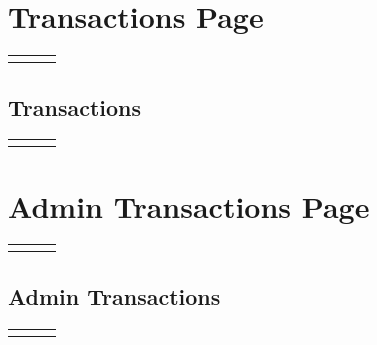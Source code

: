 \documentclass[12pt, letterpaper]{article}
\newcommand{\IPO}[3]{
  \begin{center}
    \begin{tabularx}{\linewidth}{XXX}
      \toprule
      \thead{Input} & \thead{Process} & \thead{Output} \\
      \midrule
      \RaggedRight{#1} & \RaggedRight{#2} & \RaggedRight{#3} \\
      \bottomrule
    \end{tabularx}
  \end{center}
}
\newcommand{\n}{\newline}
\begin{document}
\section{Transactions Page}

\IPO{``Transactions'' button}{Render navigation bar (\ref{navbar})\n Render transactions}{Transactions page}

\subsection{Transactions}

\IPO{\begin{itemize}\item User ID (\texttt{int})\item Filter by (\texttt{enum})\end{itemize}}{Query database for transactions linked to specified user ID and filter\n~\n Render ``filter by'' selection\n\textbf{IF} transactions is empty\n$\Rightarrow$Render ``empty'' \n\textbf{ELSE}\n$\Rightarrow$\textbf{FOR} each transaction\n$\Rightarrow\Rightarrow$Render item count, relative time, and type (``in''/``out'')\n$\Rightarrow\Rightarrow$On press, reveal quantity and title of each part}{Transactions}

\section{Admin Transactions Page}

\IPO{(Admin)``Transactions'' button}{Render admin navigation bar (\ref{adminnavbar})\n Render admin transactions}{Admin transactions page}

\subsection{Admin Transactions}

\IPO{Filter by (\texttt{enum})}{Query database for all transactions and filter by specified filter\n~\n Render ``filter by'' selection\n\textbf{IF} transactions is empty\n$\Rightarrow$Render ``empty'' \n\textbf{ELSE}\n$\Rightarrow$\textbf{FOR} each transaction\n$\Rightarrow\Rightarrow$Render item count, relative time, type (``in''/``out''), and user's full name\n$\Rightarrow\Rightarrow$On press, reveal quantity and title of each part}{Admin transactions}
\end{document}
